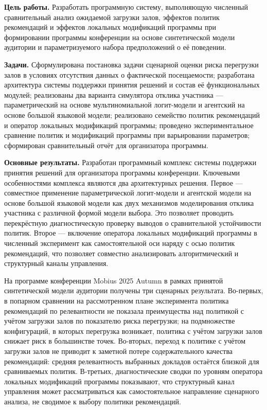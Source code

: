 \begingroup
\singlespacing
\fontsize{12pt}{14pt}\selectfont

\noindent\textbf{Цель работы.} Разработать программную систему, выполняющую численный сравнительный анализ ожидаемой загрузки залов, эффектов политик рекомендаций и эффектов локальных модификаций программы при формировании программы конференции на основе синтетической модели аудитории и параметризуемого набора предположений о её поведении.

\vspace{0.3em}

\noindent\textbf{Задачи.} Сформулирована постановка задачи сценарной оценки риска перегрузки залов в условиях отсутствия данных о фактической посещаемости; разработана архитектура системы поддержки принятия решений и состав её функциональных модулей; реализованы два варианта симулятора отклика участника --- параметрический на основе мультиномиальной логит-модели и агентский на основе большой языковой модели; реализовано семейство политик рекомендаций и оператор локальных модификаций программы; проведено экспериментальное сравнение политик и модификаций программы при варьировании параметров; сформирован сравнительный отчёт для организатора программы.

\vspace{0.3em}

\noindent\textbf{Основные результаты.} Разработан программный комплекс системы поддержки принятия решений для организатора программы конференции. Ключевыми особенностями комплекса являются два архитектурных решения. Первое --- совместное применение параметрической логит-модели и агентской модели на основе большой языковой модели как двух механизмов моделирования отклика участника с различной формой модели выбора. Это позволяет проводить перекрёстную диагностическую проверку выводов о сравнительной устойчивости политик. Второе --- включение оператора локальных модификаций программы в численный эксперимент как самостоятельной оси наряду с осью политик рекомендаций, что позволяет совместно анализировать алгоритмический и структурный каналы управления.

\vspace{0.3em}

\noindent На программе конференции Mobius 2025 Autumn в рамках принятой синтетической модели аудитории получены три сценарных результата. Во-первых, в попарном сравнении на рассмотренном плане эксперимента политика рекомендаций по релевантности не показала преимущества над политикой с учётом загрузки залов по показателю риска перегрузки; на подмножестве конфигураций, в которых перегрузка возникает, политика с учётом загрузки залов снижает риск в большинстве точек. Во-вторых, переход к политике с учётом загрузки залов не приводит к заметной потере содержательного качества рекомендаций: средняя релевантность выбранных докладов остаётся близкой для сравниваемых политик. В-третьих, диагностические сводки по уровням оператора локальных модификаций программы показывают, что структурный канал управления может рассматриваться как самостоятельное направление сценарного анализа, не сводимое к выбору политики рекомендаций.

